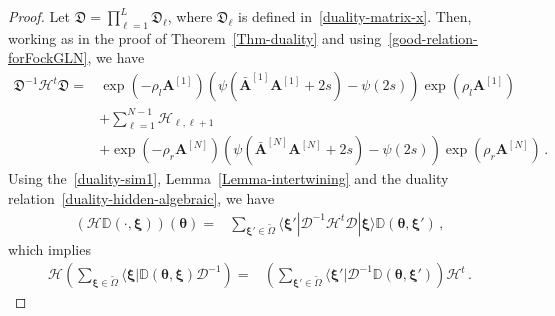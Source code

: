 \documentclass[11pt]{article}
\numberwithin{equation}{section}
\newcommand{\OA}{\mathbf{A}}
\newcommand{\OAD}{\mathbf{\bar{A}}}
\newcommand{\N}{N}
\newcommand{\eH}{\mathcal{H}}
\newcommand{\ecH}{\bm{\mathscr{H}}}
\newcommand{\hidden}{\theta}
\begin{document}
\begin{proof}
Let $\mathfrak{D}= \prod_{\ell=1}^{L}\mathfrak{D}_{\ell}$, where $\mathfrak{D}_{\ell}$ is defined in~\eqref{duality-matrix-x}. Then, working as in the proof of Theorem~\ref{Thm-duality} and using~\eqref{good-relation-forFockGLN}, we have
 \begin{equation}\label{similarity-hidden}
 \begin{split}
     	\mathfrak{D}^{-1}\eH^t \mathfrak{D}=&\exp{\left(-\rho_{l}\OA^{[1]}
                  \right)}\left(\psi(\OAD^{[1]}\OA^{[1]}+2s)-\psi(2s)\right)
 		\exp{\left(\rho_{l}\OA^{[1]}
                  \right)}
         \\&+\sum_{\ell=1}^{\N-1}\eH_{\ell,\ell+1}
         \\&+
         \exp{\left(-\rho_{r}\OA^{[\N]}
                  \right)}\left(\psi(\OAD^{[\N]}\OA^{[\N]}+2s)-\psi(2s)\right)
 		\exp{\left(\rho_{r}\OA^{[\N]}
                  \right)}\,.
 \end{split}
 \end{equation}
Using the~\eqref{duality-sim1}, Lemma~\ref{Lemma-intertwining} and the duality relation~\eqref{duality-hidden-algebraic}, we have
\begin{equation}
    \begin{split}
        \left(\ecH \mathbb{D}(\cdot,\bm{\xi})\right)(\bm{\hidden})=&\sum_{\bm{\xi}'\in\widetilde{\Omega}}\langle \bm{\xi}'|\mathcal{D}^{-1}\eH^{t}\mathcal{D}|\bm{\xi}\rangle\mathbb{D}(\bm{\hidden},\bm{\xi}')\,,    \end{split}
\end{equation}
which implies 
\begin{equation}
    \begin{split}
          \ecH\left(\sum_{\bm{\xi}\in \widetilde{\Omega}}\langle\bm{\xi}|\mathbb{D}(\bm{\hidden},\bm{\xi})\mathcal{D}^{-1}\right)=&\left(\sum_{\bm{\xi}'\in\widetilde{\Omega}}\langle \bm{\xi}'|\mathcal{D}^{-1}\mathbb{D}(\bm{\hidden},\bm{\xi}')\right)\eH^{t}\,.
    \end{split}
\end{equation}
\end{proof}
\end{document}
